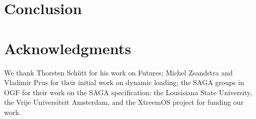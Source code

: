 \documentclass{acm_proc_article-sp}
\begin{document}
  \section{Conclusion}
    \label{sec:Conclusion}
    


  \section{Acknowledgments}
  \label{sec:ack}
  
  We thank Thorsten Sch\"utt for his work on Futures; Michel Zsandstra
  and Vladimir Prus for their initial work on dynamic loading; the SAGA 
  groups in OGF for their work on the SAGA specification; the
  Lousisiana State University, the Vrije Universiteit Amsterdam, and
  the XtreemOS project for funding our work.




\end{document}
